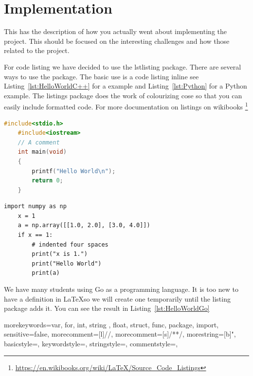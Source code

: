 \chapter{Implementation}
\label{chap:implementation}
This has the description of how you actually went about implementing the project.  This should be focused on the interesting challenges and how those related to the project.



For code listing we have decided to use the lstlisting package. There are several ways to use the package.  The basic use is a code listing inline see Listing~\ref{lst:HelloWorldC++} for a \CPP example and Listing~\ref{lst:Python} for a Python example. The listings package does the work of colourizing cose so that you can easily include formatted code.   For more documentation on listings on wikibooks \footnote{\url{https://en.wikibooks.org/wiki/LaTeX/Source_Code_Listings}}

\lstset{frameround=tttt}
\lstset{frame=single}
\lstset{xleftmargin=.05\textwidth, xrightmargin=.05\textwidth}


\begin{lstlisting}[language=C++, caption= {Hello World C++ The code listing for Hello World in C++, with colour syntax highlighting.}, label={lst:HelloWorldC++}]
    #include<stdio.h>
    #include<iostream>
    // A comment
    int main(void)
    {
        printf("Hello World\n");
        return 0;
    }
\end{lstlisting}

\lstset{language=Python}
\begin{lstlisting}[caption = {The code listing for a Python increment a matrix example}, label={lst:Python}]
    import numpy as np
    x = 1
    a = np.array([[1.0, 2.0], [3.0, 4.0]])
    if x == 1:
        # indented four spaces
        print("x is 1.")
        print("Hello World")
        print(a)
\end{lstlisting}


We have many students using Go as a programming language.  It is too new to have a definition in \LaTeX so we will create one temporarily until the listing package adds it. You can see the result in Listing~\ref{lst:HelloWorldGo}

    {   morekeywords={var, for, int, string , float, struct, func, package, import},
        sensitive=false,
        morecomment=[l]{//},
        morecomment=[s]{/*}{*/},
        morestring=[b]",
        basicstyle=\ttfamily,
        keywordstyle=\color{red}\ttfamily,
        stringstyle=\color{darkgreen}\ttfamily,
        commentstyle=\color{blue}\ttfamily,
    }

